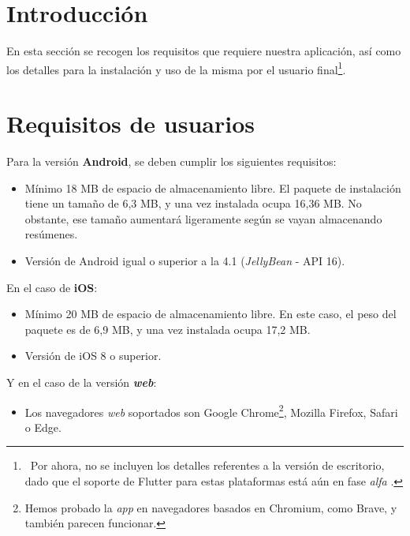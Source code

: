 \label{apendice:usuario}

\section{Introducción}

En esta sección se recogen los requisitos que requiere nuestra aplicación, así como los detalles para la instalación y uso de la misma por el usuario final\footnote{\, Por ahora, no se incluyen los detalles referentes a la versión de escritorio, dado que el soporte de Flutter para estas plataformas está aún en fase \emph{alfa} \cite{flutter-desktop}.}.

\section{Requisitos de usuarios}

Para la versión \textbf{Android}, se deben cumplir los siguientes requisitos:

\vspace{-0.3cm}
\begin{itemize} [\textbullet]
	\item Mínimo 18 MB de espacio de almacenamiento libre. El paquete de instalación tiene un tamaño de 6,3 MB, y una vez instalada ocupa 16,36 MB. No obstante, ese tamaño aumentará ligeramente según se vayan almacenando resúmenes.
	
	\item Versión de Android igual o superior a la 4.1 (\emph{JellyBean} - API 16).
\end{itemize}

En el caso de \textbf{iOS}:

\vspace{-0.3cm}
\begin{itemize} [\textbullet]
	\item Mínimo 20 MB de espacio de almacenamiento libre. En este caso, el peso del paquete es de 6,9 MB, y una vez instalada ocupa 17,2 MB.
	
	\item Versión de iOS 8 o superior.
\end{itemize}

\newpage

Y en el caso de la versión \emph{\textbf{web}}:

\begin{itemize} [\textbullet]
	\item Los navegadores \emph{web} soportados son Google Chrome\footnote{Hemos probado la \emph{app} en navegadores basados en Chromium, como Brave, y también parecen funcionar.}, Mozilla Firefox, Safari o Edge.
\end{itemize}

